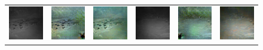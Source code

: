 \begin{figure}[htp!]
\begin{tabularx}{\textwidth}{Y Y Y !{\space} Y Y Y}
        \includegraphics{gfx/conditional-diffusion-sampling-caltech-qual/nir_585a6303-23d2-11e8-a6a3-ec086b02610b.jpg} & \includegraphics{gfx/conditional-diffusion-sampling-caltech-qual/cyclegan_585a6303-23d2-11e8-a6a3-ec086b02610b_fake.png} & \includegraphics{gfx/conditional-diffusion-sampling-caltech-qual/diffusion_585a6303-23d2-11e8-a6a3-ec086b02610b.png} & \includegraphics{gfx/conditional-diffusion-sampling-caltech-qual/nir_585a6394-23d2-11e8-a6a3-ec086b02610b.jpg} & \includegraphics{gfx/conditional-diffusion-sampling-caltech-qual/cyclegan_585a6394-23d2-11e8-a6a3-ec086b02610b_fake.png} & \includegraphics{gfx/conditional-diffusion-sampling-caltech-qual/diffusion_585a6394-23d2-11e8-a6a3-ec086b02610b.png} \\

\end{tabularx}
\end{figure}
